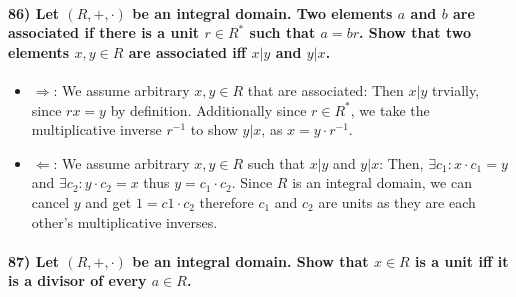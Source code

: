 \documentclass[
]{article}
\begin{document}
\hypertarget{let-rcdot-be-an-integral-domain.-two-elements-a-and-b-are-associated-if-there-is-a-unit-rin-r-such-that-a-br.-show-that-two-elements-xy-in-r-are-associated-iff-x-y-and-y-x.}{%
\paragraph{\texorpdfstring{86) Let \((R,+,\cdot)\) be an integral
domain. Two elements \(a\) and \(b\) are associated if there is a unit
\(r\in R^*\) such that \(a = br\). Show that two elements \(x,y \in R\)
are associated iff \(x | y\) and
\(y | x\).}{86) Let (R,+,\textbackslash cdot) be an integral domain. Two elements a and b are associated if there is a unit r\textbackslash in R\^{}* such that a = br. Show that two elements x,y \textbackslash in R are associated iff x \textbar{} y and y \textbar{} x.}}\label{let-rcdot-be-an-integral-domain.-two-elements-a-and-b-are-associated-if-there-is-a-unit-rin-r-such-that-a-br.-show-that-two-elements-xy-in-r-are-associated-iff-x-y-and-y-x.}}

\begin{itemize}
\item
  \(\Rightarrow\): We assume arbitrary \(x,y \in R\) that are
  associated: Then \(x | y\) trvially, since \(rx = y\) by definition.
  Additionally since \(r \in R^*\), we take the multiplicative inverse
  \(r^{-1}\) to show \(y|x\), as \(x = y \cdot r^{-1}\).
\item
  \(\Leftarrow\): We assume arbitrary \(x,y \in R\) such that \(x|y\)
  and \(y|x\): Then, \(\exists c_1: x \cdot c_1 = y\) and
  \(\exists c_2: y \cdot c_2 = x\) thus \(y = c_1 \cdot c_2\). Since
  \(R\) is an integral domain, we can cancel \(y\) and get
  \(1 = c1 \cdot c_2\) therefore \(c_1\) and \(c_2\) are units as they
  are each other's multiplicative inverses.
\end{itemize}

\hypertarget{let-rcdot-be-an-integral-domain.-show-that-x-in-r-is-a-unit-iff-it-is-a-divisor-of-every-a-in-r.}{%
\paragraph{\texorpdfstring{87) Let \((R,+,\cdot)\) be an integral
domain. Show that \(x \in R\) is a unit iff it is a divisor of every
\(a \in R\).}{87) Let (R,+,\textbackslash cdot) be an integral domain. Show that x \textbackslash in R is a unit iff it is a divisor of every a \textbackslash in R.}}\label{let-rcdot-be-an-integral-domain.-show-that-x-in-r-is-a-unit-iff-it-is-a-divisor-of-every-a-in-r.}}
\end{document}
